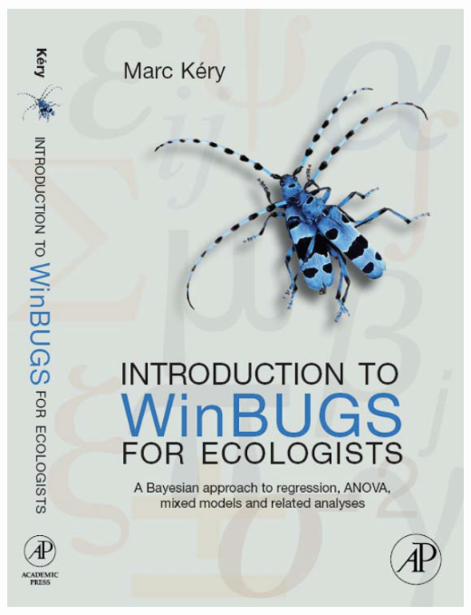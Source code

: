 \documentclass[
  ignorenonframetext,
  aspectratio=169]{beamer}
\begin{document}
\begin{frame}
\begin{center}\includegraphics[width=8.58in]{img/kery} \end{center}
\end{frame}
\end{document}
